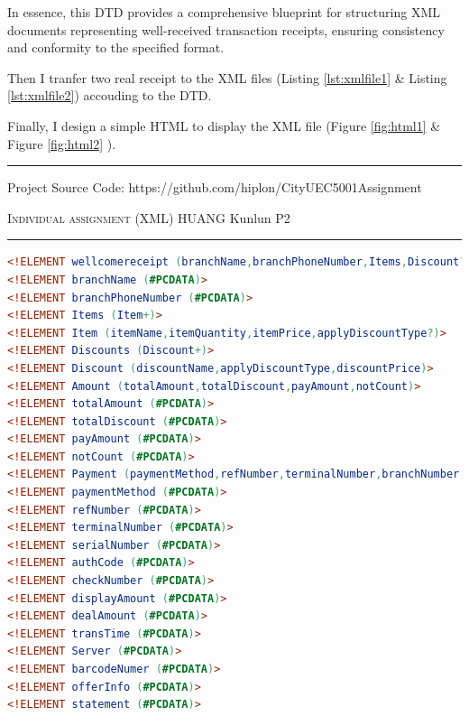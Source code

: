 \documentclass[12pt]{amsart}
\begin{document}
In essence, this DTD provides a comprehensive blueprint for structuring XML documents representing well-received transaction receipts, ensuring consistency and conformity to the specified format.

\bigskip

Then I tranfer two real receipt to the XML files  (Listing \ref{lst:xmlfile1} \& Listing \ref{lst:xmlfile2})  accouding to the DTD.

\bigskip

Finally, I design a simple HTML to display the XML file (Figure \ref{fig:html1} \& Figure \ref{fig:html2} ).



\bigskip

\bigskip

\bigskip

\bigskip

\bigskip

\bigskip

\bigskip

\bigskip

\bigskip

\bigskip

\bigskip

\hrule

\smallskip

Project Source Code: https://github.com/hiplon/CityUEC5001Assignment

\newpage

 \hfill {\scshape \large Individual assignment (XML)} \hfill HUANG Kunlun \hfill {\scshape P2}
 
 
\smallskip

\hrule

\bigskip


\smallskip

\begin{lstlisting}[caption={DTD file},label={lst:dtdfile},
    language=DTD,breaklines=true]
<!ELEMENT wellcomereceipt (branchName,branchPhoneNumber,Items,Discount?,Amount,Payment,transTime,Server,barcodeNumer,offerInfo?,statement)>
<!ELEMENT branchName (#PCDATA)>
<!ELEMENT branchPhoneNumber (#PCDATA)>
<!ELEMENT Items (Item+)>
<!ELEMENT Item (itemName,itemQuantity,itemPrice,applyDiscountType?)>
<!ELEMENT Discounts (Discount+)>
<!ELEMENT Discount (discountName,applyDiscountType,discountPrice)>
<!ELEMENT Amount (totalAmount,totalDiscount,payAmount,notCount)>
<!ELEMENT totalAmount (#PCDATA)>
<!ELEMENT totalDiscount (#PCDATA)>
<!ELEMENT payAmount (#PCDATA)>
<!ELEMENT notCount (#PCDATA)>
<!ELEMENT Payment (paymentMethod,refNumber,terminalNumber,branchNumber,serialNumber,authCode,checkNumber,payAmount,dealAmount)>
<!ELEMENT paymentMethod (#PCDATA)>
<!ELEMENT refNumber (#PCDATA)>
<!ELEMENT terminalNumber (#PCDATA)>
<!ELEMENT serialNumber (#PCDATA)>
<!ELEMENT authCode (#PCDATA)>
<!ELEMENT checkNumber (#PCDATA)>
<!ELEMENT displayAmount (#PCDATA)>
<!ELEMENT dealAmount (#PCDATA)>
<!ELEMENT transTime (#PCDATA)>
<!ELEMENT Server (#PCDATA)> 
<!ELEMENT barcodeNumer (#PCDATA)> 
<!ELEMENT offerInfo (#PCDATA)> 
<!ELEMENT statement (#PCDATA)> 
\end{lstlisting}
\end{document}
